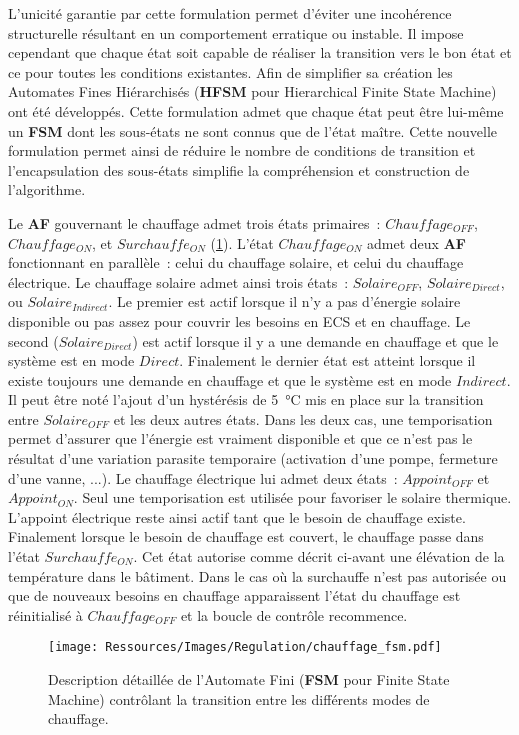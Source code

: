 L’unicité garantie par cette formulation permet d’éviter une incohérence structurelle
résultant en un comportement erratique ou instable. Il impose cependant que chaque état
soit capable de réaliser la transition vers le bon état et ce pour toutes les conditions
existantes. Afin de simplifier sa création les Automates Fines Hiérarchisés (\textbf{HFSM}
pour Hierarchical Finite State Machine) ont été développés. Cette formulation admet que
chaque état peut être lui-même un \textbf{FSM} dont les sous-états ne sont connus que de
l’état maître. Cette nouvelle formulation permet ainsi de réduire le nombre de conditions
de transition et l’encapsulation des sous-états simplifie la compréhension et construction
de l’algorithme.


Le \textbf{AF} gouvernant le chauffage admet trois états primaires~: $Chauffage_{OFF}$,
$Chauffage_{ON}$, et $Surchauffe_{ON}$ (\ref{fig:automate_chauffage}). L’état
$Chauffage_{ON}$ admet deux \textbf{AF} fonctionnant en parallèle~: celui du chauffage
solaire, et celui du chauffage électrique. Le chauffage solaire admet ainsi trois états~:
$Solaire_{OFF}$, $Solaire_{Direct}$, ou $Solaire_{Indirect}$. Le premier est actif lorsque
il n’y a pas d’énergie solaire disponible ou pas assez pour couvrir les besoins en ECS et
en chauffage. Le second ($Solaire_{Direct}$) est actif lorsque il y a une demande en
chauffage et que le système est en mode $Direct$. Finalement le dernier état est atteint
lorsque il existe toujours une demande en chauffage et que le système est en mode
$Indirect$.
Il peut être noté l’ajout d’un hystérésis de \SI{5}{\celsius} mis en place sur la
transition entre $Solaire_{OFF}$ et les deux autres états. Dans les deux cas, une
temporisation permet d’assurer que l’énergie est vraiment disponible et que ce n’est pas
le résultat d’une variation parasite temporaire (activation d’une pompe, fermeture d’une
vanne, ...). Le chauffage électrique lui admet deux états~: $Appoint_{OFF}$ et
$Appoint_{ON}$. Seul une temporisation est utilisée pour favoriser le solaire thermique.
L’appoint électrique reste ainsi actif tant que le besoin de chauffage existe. Finalement
lorsque le besoin de chauffage est couvert, le chauffage passe dans l’état
$Surchauffe_{ON}$. Cet état autorise comme décrit ci-avant une élévation de la température
dans le bâtiment. Dans le cas où la surchauffe n’est pas autorisée ou que de nouveaux
besoins en chauffage apparaissent l’état du chauffage est réinitialisé à $Chauffage_{OFF}$
et la boucle de contrôle recommence.

\begin{figure}
    \begin{center}
        \texttt{[image: Ressources/Images/Regulation/chauffage\_fsm.pdf]}
    \end{center}
    \caption{Description détaillée de l’Automate Fini (\textbf{FSM} pour Finite State Machine)
             contrôlant la transition entre les différents modes de chauffage.
             \label{fig:automate_chauffage}}
\end{figure}


